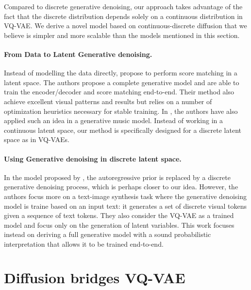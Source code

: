 \documentclass[nolayout]{article}
\theoremstyle{plain}
\theoremstyle{definition}
\theoremstyle{remark}
\begin{document}
Compared to discrete generative denoising, our approach takes advantage of the fact that the discrete distribution depends solely on a continuous distribution in VQ-VAE. We derive a novel model based on continuous-discrete diffusion that we believe is simpler and more scalable than the models mentioned in this section.

\paragraph{From Data to Latent Generative denoising.}
Instead of modelling the data directly, \cite{vahdat2021score} propose to perform score matching in a latent space. The authors propose a complete generative model and are able to train the encoder/decoder and score matching end-to-end. Their method also achieve excellent visual patterns and results but relies on a number of optimization heuristics necessary for stable training. In \cite{mittal2021symbolic}, the authors  have also applied such an idea in a generative music model. Instead of working in a continuous latent space, our method is specifically designed for a discrete latent space as in VQ-VAEs.


\paragraph{Using Generative denoising in discrete latent space. }
In the model proposed by \cite{gu2021vector}, the autoregressive prior is replaced by a discrete generative denoising process, which is perhaps closer to our idea. However, the authors focus more on a text-image synthesis task where the generative denoising model is traine based on an input text: it generates a set of discrete visual tokens given a sequence of text tokens. They also consider the VQ-VAE as a trained model and focus only on the generation of latent variables. This work focuses instead on deriving a full generative model with a sound probabilistic interpretation that allows it to be trained end-to-end.

\section{Diffusion bridges VQ-VAE}
\end{document}
